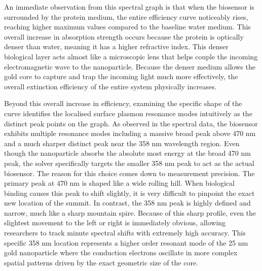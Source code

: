 \documentclass[class=report, crop=false]{standalone}
\begin{document}
\vspace{12pt}

An immediate observation from this spectral graph is that when the biosensor is surrounded by the protein medium, the entire efficiency curve noticeably rises, reaching higher maximum values compared to the baseline water medium. This overall increase in absorption strength occurs because the protein is optically denser than water, meaning it has a higher refractive index. This denser biological layer acts almost like a microscopic lens that helps couple the incoming electromagnetic wave to the nanoparticle. Because the denser medium allows the gold core to capture and trap the incoming light much more effectively, the overall extinction efficiency of the entire system physically increases.

\vspace{12pt}

Beyond this overall increase in efficiency, examining the specific shape of the curve identifies the localised surface plasmon resonance modes intuitively as the distinct peak points on the graph. As observed in the spectral data, the biosensor exhibits multiple resonance modes including a massive broad peak above 470 nm and a much sharper distinct peak near the 358 nm wavelength region. Even though the nanoparticle absorbs the absolute most energy at the broad 470 nm peak, the solver specifically targets the smaller 358 nm peak to act as the actual biosensor. The reason for this choice comes down to measurement precision. The primary peak at 470 nm is shaped like a wide rolling hill. When biological binding causes this peak to shift slightly, it is very difficult to pinpoint the exact new location of the summit. In contrast, the 358 nm peak is highly defined and narrow, much like a sharp mountain spire. Because of this sharp profile, even the slightest movement to the left or right is immediately obvious, allowing researchers to track minute spectral shifts with extremely high accuracy. This specific 358 nm location represents a higher order resonant mode of the 25 nm gold nanoparticle where the conduction electrons oscillate in more complex spatial patterns driven by the exact geometric size of the core.
\end{document}
